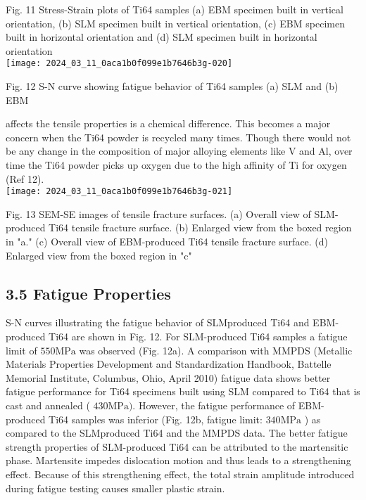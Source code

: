 \documentclass[10pt]{article}
\begin{document}
Fig. 11 Stress-Strain plots of Ti64 samples (a) EBM specimen built in vertical orientation, (b) SLM specimen built in vertical orientation, (c) EBM specimen built in horizontal orientation and (d) SLM specimen built in horizontal orientation\\
\texttt{[image: 2024\_03\_11\_0aca1b0f099e1b7646b3g-020]}

Fig. 12 S-N curve showing fatigue behavior of Ti64 samples (a) SLM and (b) EBM

affects the tensile properties is a chemical difference. This becomes a major concern when the Ti64 powder is recycled many times. Though there would not be any change in the composition of major alloying elements like $\mathrm{V}$ and $\mathrm{Al}$, over time the Ti64 powder picks up oxygen due to the high affinity of Ti for oxygen (Ref 12).\\
\texttt{[image: 2024\_03\_11\_0aca1b0f099e1b7646b3g-021]}

Fig. 13 SEM-SE images of tensile fracture surfaces. (a) Overall view of SLM-produced Ti64 tensile fracture surface. (b) Enlarged view from the boxed region in "a." (c) Overall view of EBM-produced Ti64 tensile fracture surface. (d) Enlarged view from the boxed region in "c"

\subsection*{3.5 Fatigue Properties}
S-N curves illustrating the fatigue behavior of SLMproduced Ti64 and EBM-produced Ti64 are shown in Fig. 12. For SLM-produced Ti64 samples a fatigue limit of $550 \mathrm{MPa}$ was observed (Fig. 12a). A comparison with MMPDS (Metallic Materials Properties Development and Standardization Handbook, Battelle Memorial Institute, Columbus, Ohio, April 2010) fatigue data shows better fatigue performance for Ti64 specimens built using SLM compared to Ti64 that is cast and annealed ( $430 \mathrm{MPa})$. However, the fatigue performance of EBM-produced Ti64 samples was inferior (Fig. 12b, fatigue limit: $340 \mathrm{MPa}$ ) as compared to the SLMproduced Ti64 and the MMPDS data. The better fatigue strength properties of SLM-produced Ti64 can be attributed to the martensitic phase. Martensite impedes dislocation motion and thus leads to a strengthening effect. Because of this strengthening effect, the total strain amplitude introduced during fatigue testing causes smaller plastic strain.
\end{document}
